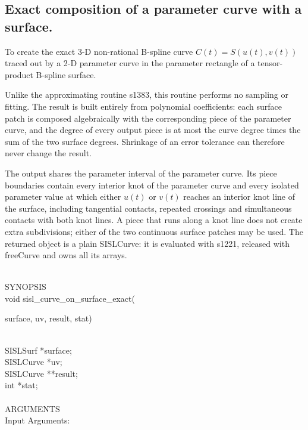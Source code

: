 \subsection{Exact composition of a parameter curve with a surface.}
\begin{minipg1}
  To create the exact 3-D non-rational B-spline curve
  $C(t)=S(u(t),v(t))$ traced out by a 2-D parameter curve in the
  parameter rectangle of a tensor-product B-spline surface.

  Unlike the approximating routine s1383, this routine performs no
  sampling or fitting.  The result is built entirely from polynomial
  coefficients: each surface patch is composed algebraically with the
  corresponding piece of the parameter curve, and the degree of every
  output piece is at most the curve degree times the sum of the two
  surface degrees.  Shrinkage of an error tolerance can therefore never
  change the result.

  The output shares the parameter interval of the parameter curve.
  Its piece boundaries contain every interior knot of the parameter
  curve and every isolated parameter value at which either $u(t)$ or
  $v(t)$ reaches an interior knot line of the surface, including
  tangential contacts, repeated crossings and simultaneous contacts
  with both knot lines.  A piece that runs along a knot line does not
  create extra subdivisions; either of the two continuous surface
  patches may be used.  The returned object is a plain SISLCurve: it is
  evaluated with s1221, released with freeCurve and owns all its
  arrays.
\end{minipg1} \\
SYNOPSIS\\
        \>void sisl\_curve\_on\_surface\_exact(\begin{minipg3}
                        {\fov surface}, {\fov uv}, {\fov result}, {\fov stat})
                \end{minipg3}\\[0.3ex]
                \>\>    SISLSurf        \>      *{\fov surface};\\
                \>\>    SISLCurve       \>      *{\fov uv};\\
                \>\>    SISLCurve       \>      **{\fov result};\\
                \>\>    int     \>      *{\fov stat};\\
\\
ARGUMENTS\\
        \>Input Arguments:\\
